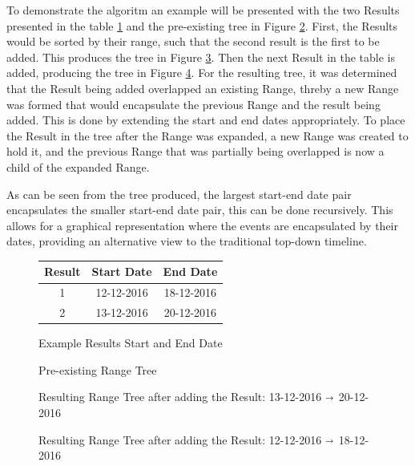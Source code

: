 \par To demonstrate the algoritm an example will be presented with the two Results presented in the table \ref{fig:resultsTable} and the pre-existing tree in Figure \ref{fig:rangeTreePre}. First, the Results would be sorted by their range, such that the second result is the first to be added. This produces the tree in Figure \ref{fig:rangeTree1}. Then the next Result in the table is added, producing the tree in Figure \ref{fig:rangeTree2}. For the resulting tree, it was determined that the Result  being added overlapped an existing Range, threby a new Range was formed that would encapsulate the previous Range and the result being added. This is done by extending the start and end dates appropriately. To place the Result in the tree after the Range was expanded, a new Range was created to hold it, and the previous Range that was partially being overlapped is now a child of the expanded Range.
\par As can be seen from the tree produced, the largest start-end date pair encapsulates the smaller start-end date pair, this can be done recursively. This allows for a graphical representation where the events are encapsulated by their dates, providing an alternative view to the traditional top-down timeline.
\begin{figure}[h]
\begin{center}
\begin{tabular}{ |c|c|c| } 
 \hline
Result & Start Date & End Date \\
\hline
\hline
1 & 12-12-2016 & 18-12-2016 \\
2 & 13-12-2016 & 20-12-2016 \\
 \hline
\end{tabular}
\end{center}
\caption{Example Results Start and End Date}
\label{fig:resultsTable}
\end{figure}
\begin{figure}[h]
\resizebox{\linewidth}{!}{
\Tree
 [.{01-01-1980  $\shortrightarrow$ 31-12-2016}
	[.{01-01-2008  $\shortrightarrow$ 31-05-2016} {01-01-2015} ]
	[{01-11-2016} ] 
]
}
\caption{Pre-existing Range Tree}
\label{fig:rangeTreePre}
\end{figure}
\begin{figure}[h]
\resizebox{\linewidth}{!}{
\Tree
 [.{01-01-1980 $\shortrightarrow$ 31-12-2016}
	[.{01-01-2008  $\shortrightarrow$ 31-05-2016} {01-01-2015} ]
	[{13-12-2016  $\shortrightarrow$ 20-12-2016} ]
	[{01-11-2016} ] 
]
}
\caption{Resulting Range Tree after adding the Result: 13-12-2016  $\shortrightarrow$ 20-12-2016}
\label{fig:rangeTree1}
\end{figure}
\begin{figure}
\caption{Resulting Range Tree after adding the Result: 12-12-2016 $\shortrightarrow$ 18-12-2016}
\label{fig:rangeTree2}
\end{figure}

